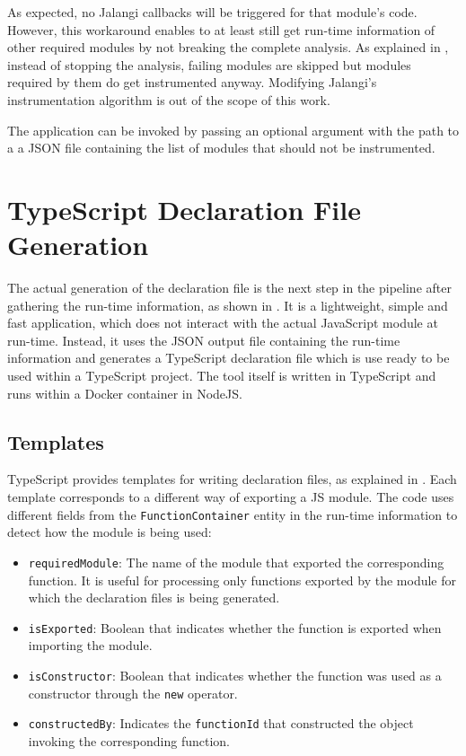 As expected, no Jalangi callbacks will be triggered for that module's code. However, this workaround enables to at least still get run-time information of other required modules by not breaking the complete analysis. As explained in , instead of stopping the analysis, failing modules are skipped but modules required by them do get instrumented anyway. Modifying Jalangi's instrumentation algorithm is out of the scope of this work.

The application can be invoked by passing an optional argument with the path to a a JSON file containing the list of modules that should not be instrumented.



\section{TypeScript Declaration File Generation}
The actual generation of the declaration file is the next step in the pipeline after gathering the run-time information, as shown in . It is a lightweight, simple and fast application, which does not interact with the actual JavaScript module at run-time. Instead, it uses the JSON output file containing the run-time information and generates a TypeScript declaration file which is use ready to be used within a TypeScript project. The tool itself is written in TypeScript and runs within a Docker container in NodeJS. 

\subsection{Templates}
TypeScript provides templates for writing declaration files, as explained in . Each template corresponds to a different way of exporting a JS module. The code uses different fields from the \texttt{FunctionContainer} entity in the run-time information to detect how the module is being used:

\begin{itemize}
  \item \texttt{requiredModule}: The name of the module that exported the corresponding function. It is useful for processing only functions exported by the module for which the declaration files is being generated.
  \item \texttt{isExported}: Boolean that indicates whether the function is exported when importing the module.
  \item \texttt{isConstructor}: Boolean that indicates whether the function was used as a constructor through the \texttt{new} operator.
  \item \texttt{constructedBy}: Indicates the \texttt{functionId} that constructed the object invoking the corresponding function.
\end{itemize}

